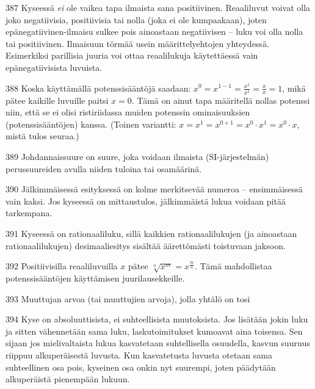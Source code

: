 \begin{Vastaus}{387}
Kyseessä \textit{ei} ole vaikea tapa ilmaista sana positiivinen. Reaaliluvut voivat olla joko negatiivisia, positiivisia tai nolla (joka ei ole kumpaakaan), joten epänegatiivinen-ilmaisu sulkee pois ainoastaan negatiivisen -- luku voi olla nolla tai positiivinen. Ilmaisuun törmää usein määrittelyehtojen yhteydessä. Esimerkiksi parillisia juuria voi ottaa reaalilukuja käytettäessä vain epänegatiivisista luvuista.
\end{Vastaus}
\begin{Vastaus}{388}
Koska käyttämällä potenssisääntöjä saadaan: $x^0=x^{1-1}=\frac{x^1}{x^1}=\frac{x}{x}=1$, mikä pätee kaikille luvuille paitsi $x=0$. Tämä on ainut tapa määritellä nollas potenssi niin, että se ei olisi ristiriidassa muiden potenssin ominaisuuksien (potenssisääntöjen) kanssa. (Toinen variantti: $x=x^1=x^{0+1}=x^0 \cdot x^1 = x^0 \cdot x$, mistä tulos seuraa.)
\end{Vastaus}
\begin{Vastaus}{389}
Johdannaissuure on suure, joka voidaan ilmaista (SI-järjestelmän) perussuureiden avulla niiden tuloina tai osamäärinä.
\end{Vastaus}
\begin{Vastaus}{390}
Jälkimmäisessä esityksessä on kolme merkitsevää numeroa -- ensimmäisessä vain kaksi. Jos kyseessä on mittaustulos, jälkimmäistä lukua voidaan pitää tarkempana.
\end{Vastaus}
\begin{Vastaus}{391}
Kyseessä on rationaaliluku, sillä kaikkien rationaalilukujen (ja ainoastaan rationaalilukujen) desimaaliesitys sisältää äärettömästi toistuvaan jaksoon.
\end{Vastaus}
\begin{Vastaus}{392}
Positiivisilla reaaliluvuilla $x$ pätee $\sqrt[n]{x^m} = x^{\frac{m}{n}}$. Tämä mahdollistaa potenssisääntöjen käyttämisen juurilausekkeille.
\end{Vastaus}
\begin{Vastaus}{393}
Muuttujan arvoa (tai muuttujien arvoja), jolla yhtälö on tosi
\end{Vastaus}
\begin{Vastaus}{394}
	Kyse on absoluuttisista, ei suhteellisista muutoksista. Jos lisätään jokin luku ja sitten vähennetään sama luku, laskutoimitukset kumoavat aina toisensa. Sen sijaan jos mielivaltaista lukua kasvatetaan suhtellisella osuudella, kasvun suuruus riippuu alkuperäisestä luvusta. Kun kasvatetusta luvusta otetaan sama suhteellinen osa pois, kyseinen osa onkin nyt suurempi, joten päädytään alkuperäistä pienempään lukuun.
	
\end{Vastaus}
